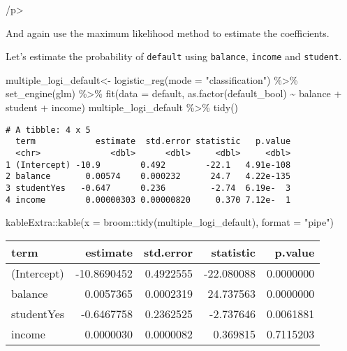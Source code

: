 \documentclass[
]{article}
\newenvironment{Shaded}{\begin{snugshade}}{\end{snugshade}}
\newcommand{\AttributeTok}[1]{\textcolor[rgb]{0.77,0.63,0.00}{#1}}
\newcommand{\FunctionTok}[1]{\textcolor[rgb]{0.00,0.00,0.00}{#1}}
\newcommand{\NormalTok}[1]{#1}
\newcommand{\OtherTok}[1]{\textcolor[rgb]{0.56,0.35,0.01}{#1}}
\newcommand{\SpecialCharTok}[1]{\textcolor[rgb]{0.00,0.00,0.00}{#1}}
\newcommand{\StringTok}[1]{\textcolor[rgb]{0.31,0.60,0.02}{#1}}
\begin{document}
/p\textgreater{}

And again use the maximum likelihood method to estimate the
coefficients.

Let's estimate the probability of \texttt{default} using
\texttt{balance}, \texttt{income} and \texttt{student}.

\begin{Shaded}
\begin{Highlighting}[]
\NormalTok{multiple\_logi\_default}\OtherTok{\textless{}{-}} \FunctionTok{logistic\_reg}\NormalTok{(}\AttributeTok{mode =} \StringTok{"classification"}\NormalTok{) }\SpecialCharTok{\%\textgreater{}\%}
  \FunctionTok{set\_engine}\NormalTok{(}\StringTok{\textquotesingle{}glm\textquotesingle{}}\NormalTok{) }\SpecialCharTok{\%\textgreater{}\%}
  \FunctionTok{fit}\NormalTok{(}\AttributeTok{data =}\NormalTok{ default, }\FunctionTok{as.factor}\NormalTok{(default\_bool) }\SpecialCharTok{\textasciitilde{}}\NormalTok{ balance }\SpecialCharTok{+}\NormalTok{ student }\SpecialCharTok{+}\NormalTok{ income)}
\NormalTok{multiple\_logi\_default }\SpecialCharTok{\%\textgreater{}\%} \FunctionTok{tidy}\NormalTok{()}
\end{Highlighting}
\end{Shaded}

\begin{verbatim}
# A tibble: 4 x 5
  term            estimate  std.error statistic   p.value
  <chr>              <dbl>      <dbl>     <dbl>     <dbl>
1 (Intercept) -10.9        0.492        -22.1   4.91e-108
2 balance       0.00574    0.000232      24.7   4.22e-135
3 studentYes   -0.647      0.236         -2.74  6.19e-  3
4 income        0.00000303 0.00000820     0.370 7.12e-  1
\end{verbatim}

\begin{Shaded}
\begin{Highlighting}[]
\NormalTok{kableExtra}\SpecialCharTok{::}\FunctionTok{kable}\NormalTok{(}\AttributeTok{x =}\NormalTok{ broom}\SpecialCharTok{::}\FunctionTok{tidy}\NormalTok{(multiple\_logi\_default), }\AttributeTok{format =} \StringTok{"pipe"}\NormalTok{)}
\end{Highlighting}
\end{Shaded}

\begin{longtable}[]{@{}lrrrr@{}}
\toprule
term & estimate & std.error & statistic & p.value \\
\midrule
\endhead
(Intercept) & -10.8690452 & 0.4922555 & -22.080088 & 0.0000000 \\
balance & 0.0057365 & 0.0002319 & 24.737563 & 0.0000000 \\
studentYes & -0.6467758 & 0.2362525 & -2.737646 & 0.0061881 \\
income & 0.0000030 & 0.0000082 & 0.369815 & 0.7115203 \\
\bottomrule
\end{longtable}
\end{document}
